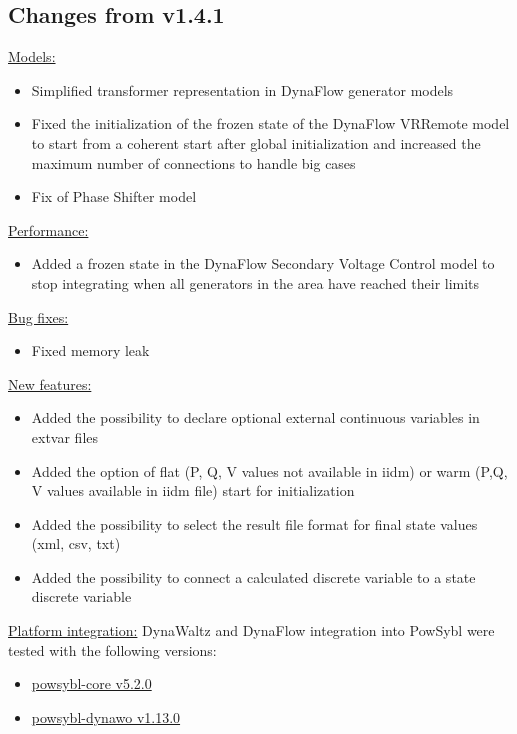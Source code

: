 \documentclass[a4paper, 12pt]{report}
\begin{document}
\subsection{Changes from v1.4.1}
\underline{Models:}

\begin{itemize}
\item Simplified transformer representation in DynaFlow generator models
\item Fixed the initialization of the frozen state of the DynaFlow VRRemote model to start from a coherent start after global initialization and increased the maximum number of connections to handle big cases
\item Fix of Phase Shifter model
\end{itemize}

\underline{Performance:}

\begin{itemize}
\item Added a frozen state in the DynaFlow Secondary Voltage Control model to stop integrating when all generators in the area have reached their limits
\end{itemize}

\underline{Bug fixes:}

\begin{itemize}
\item Fixed memory leak
\end{itemize}

\underline{New features:}
\begin{itemize}
\item Added the possibility to declare optional external continuous variables in extvar files
\item Added the option of flat (P, Q, V values not available in iidm) or warm (P,Q, V values available in iidm file) start for initialization
\item Added the possibility to select the result file format for final state values (xml, csv, txt)
\item Added the possibility to connect a calculated discrete variable to a state discrete variable
\end{itemize}

\underline{Platform integration:}
DynaWaltz and DynaFlow integration into PowSybl were tested with the following versions:
\begin{itemize}
\item \href{https://github.com/powsybl/powsybl-core/releases/tag/v5.2.0}{powsybl-core v5.2.0}
\item \href{https://github.com/powsybl/powsybl-dynawo/releases/tag/v1.13.0}{powsybl-dynawo v1.13.0}
\end{itemize}
\end{document}
